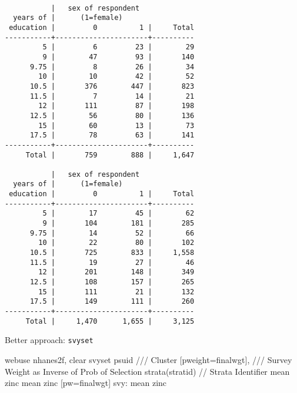 \documentclass[
  letterpaper,
  DIV=11,
  numbers=noendperiod]{scrartcl}
\newenvironment{Shaded}{\begin{snugshade}}{\end{snugshade}}
\newcommand{\CommentTok}[1]{\textcolor[rgb]{0.37,0.37,0.37}{#1}}
\newcommand{\KeywordTok}[1]{\textcolor[rgb]{0.00,0.23,0.31}{#1}}
\newcommand{\NormalTok}[1]{\textcolor[rgb]{0.00,0.23,0.31}{#1}}
\begin{document}
\begin{verbatim}

           |   sex of respondent
  years of |      (1=female)
 education |         0          1 |     Total
-----------+----------------------+----------
         5 |         6         23 |        29 
         9 |        47         93 |       140 
      9.75 |         8         26 |        34 
        10 |        10         42 |        52 
      10.5 |       376        447 |       823 
      11.5 |         7         14 |        21 
        12 |       111         87 |       198 
      12.5 |        56         80 |       136 
        15 |        60         13 |        73 
      17.5 |        78         63 |       141 
-----------+----------------------+----------
     Total |       759        888 |     1,647 

           |   sex of respondent
  years of |      (1=female)
 education |         0          1 |     Total
-----------+----------------------+----------
         5 |        17         45 |        62 
         9 |       104        181 |       285 
      9.75 |        14         52 |        66 
        10 |        22         80 |       102 
      10.5 |       725        833 |     1,558 
      11.5 |        19         27 |        46 
        12 |       201        148 |       349 
      12.5 |       108        157 |       265 
        15 |       111         21 |       132 
      17.5 |       149        111 |       260 
-----------+----------------------+----------
     Total |     1,470      1,655 |     3,125 
\end{verbatim}

Better approach: \texttt{svyset}

\begin{Shaded}
\begin{Highlighting}[]
\KeywordTok{webuse}\NormalTok{ nhanes2f, }\KeywordTok{clear}
\KeywordTok{svyset}\NormalTok{ psuid }\CommentTok{/// Cluster}
\NormalTok{       [}\KeywordTok{pweight}\NormalTok{=finalwgt], }\CommentTok{/// Survey Weight as Inverse of Prob of Selection}
       \KeywordTok{strata}\NormalTok{(stratid)     }\CommentTok{// Strata Identifier}
\KeywordTok{mean}\NormalTok{ zinc      }
\KeywordTok{mean}\NormalTok{ zinc [pw=finalwgt]}
\KeywordTok{svy}\NormalTok{: }\KeywordTok{mean}\NormalTok{ zinc      }
\end{Highlighting}
\end{Shaded}
\end{document}
